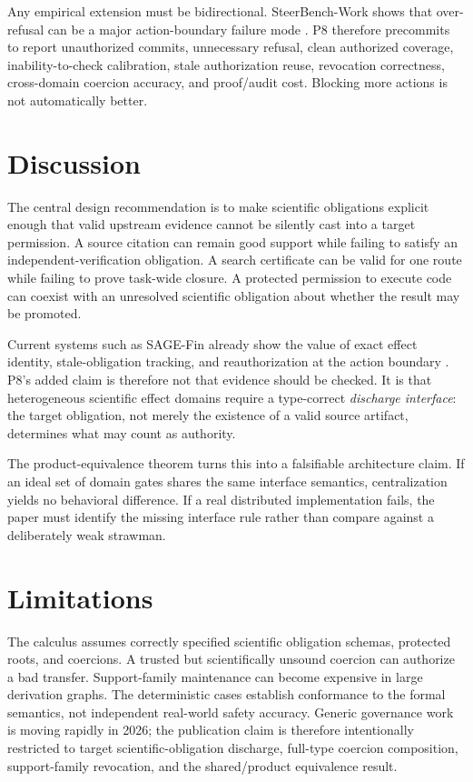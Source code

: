 \documentclass[11pt]{article}
\begin{document}
Any empirical extension must be bidirectional. SteerBench-Work shows that over-refusal can be a major action-boundary failure mode \cite{steerbench2026}. P8 therefore precommits to report unauthorized commits, unnecessary refusal, clean authorized coverage, inability-to-check calibration, stale authorization reuse, revocation correctness, cross-domain coercion accuracy, and proof/audit cost. Blocking more actions is not automatically better.

\section{Discussion}
The central design recommendation is to make scientific obligations explicit enough that valid upstream evidence cannot be silently cast into a target permission. A source citation can remain good support while failing to satisfy an independent-verification obligation. A search certificate can be valid for one route while failing to prove task-wide closure. A protected permission to execute code can coexist with an unresolved scientific obligation about whether the result may be promoted.

Current systems such as SAGE-Fin already show the value of exact effect identity, stale-obligation tracking, and reauthorization at the action boundary \cite{sagefin2026}. P8's added claim is therefore not that evidence should be checked. It is that heterogeneous scientific effect domains require a type-correct \emph{discharge interface}: the target obligation, not merely the existence of a valid source artifact, determines what may count as authority.

The product-equivalence theorem turns this into a falsifiable architecture claim. If an ideal set of domain gates shares the same interface semantics, centralization yields no behavioral difference. If a real distributed implementation fails, the paper must identify the missing interface rule rather than compare against a deliberately weak strawman.

\section{Limitations}
The calculus assumes correctly specified scientific obligation schemas, protected roots, and coercions. A trusted but scientifically unsound coercion can authorize a bad transfer. Support-family maintenance can become expensive in large derivation graphs. The deterministic cases establish conformance to the formal semantics, not independent real-world safety accuracy. Generic governance work is moving rapidly in 2026; the publication claim is therefore intentionally restricted to target scientific-obligation discharge, full-type coercion composition, support-family revocation, and the shared/product equivalence result.
\end{document}
